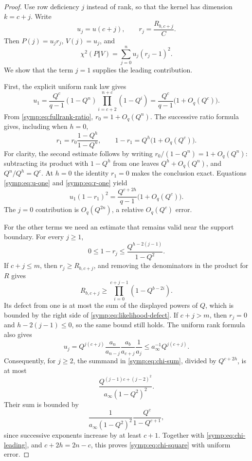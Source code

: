 \begin{proof}
Use row deficiency $j$ instead of rank, so that the kernel has dimension
$k=c+j$.  Write
\[
 u_j=u(c+j),\qquad r_j=\frac{R_{b,c+j}}C.
\]
Then $P(j)=u_jr_j$, $V(j)=u_j$, and
\begin{equation}
 \chi^2(P\Vert V)=\sum_{j=0}^{n}u_j(r_j-1)^2.
 \label{symp:eq:chi-sum}
\end{equation}
We show that the term $j=1$ supplies the leading contribution.

First, the explicit uniform rank law gives
\begin{equation}
 u_1=\frac{Q^c}{q-1}(1-Q^n)
         \prod_{i=c+2}^{n+c}(1-Q^i)
     =\frac{Q^c}{q-1}\bigl(1+O_q(Q^c)\bigr).
 \label{symp:eq:u-one}
\end{equation}
From \eqref{symp:eq:fullrank-ratio}, $r_0=1+O_q(Q^n)$.  The successive
ratio formula gives, including when $h=0$,
\begin{equation}
 r_1=r_0\frac{1-Q^h}{1-Q^n},\qquad
 1-r_1=Q^h\bigl(1+O_q(Q^c)\bigr).
 \label{symp:eq:r-one}
\end{equation}
For clarity, the second estimate follows by writing
$r_0/(1-Q^n)=1+O_q(Q^n)$: subtracting its product with $1-Q^h$ from one
leaves $Q^h+O_q(Q^n)$, and $Q^n/Q^h=Q^c$.  At $h=0$ the identity
$r_1=0$ makes the conclusion exact.  Equations
\eqref{symp:eq:u-one} and \eqref{symp:eq:r-one} yield
\begin{equation}
 u_1(1-r_1)^2
 =\frac{Q^{c+2h}}{q-1}\bigl(1+O_q(Q^c)\bigr).
 \label{symp:eq:chi-leading}
\end{equation}
The $j=0$ contribution is $O_q(Q^{2n})$, a relative
$O_q(Q^c)$ error.

For the other terms we need an estimate that remains valid near the support
boundary.  For every $j\ge1$,
\begin{equation}
 0\le1-r_j\le\frac{Q^{h-2(j-1)}}{1-Q^2}.
 \label{symp:eq:likelihood-defect}
\end{equation}
If $c+j\le m$, then $r_j\ge R_{b,c+j}$, and removing the denominators in
the product for $R$ gives
\[
 R_{b,c+j}\ge\prod_{i=0}^{c+j-1}(1-Q^{b-2i}).
\]
Its defect from one is at most the sum of the displayed powers of $Q$,
which is bounded by the right side of
\eqref{symp:eq:likelihood-defect}.  If $c+j>m$, then $r_j=0$ and
$h-2(j-1)\le0$, so the same bound still holds.  The uniform rank formula
also gives
\begin{equation}
 u_j=Q^{j(c+j)}
       \frac{a_n}{a_{n-j}}\frac{a_b}{a_{c+j}}\frac1{a_j}
     \le a_\infty^{-1}Q^{j(c+j)}.
 \label{symp:eq:rank-tail-bound}
\end{equation}
Consequently, for $j\ge2$, the summand in
\eqref{symp:eq:chi-sum}, divided by $Q^{c+2h}$, is at most
\[
 \frac{Q^{(j-1)c+(j-2)^2}}{a_\infty(1-Q^2)^2}.
\]
Their sum is bounded by
\begin{equation}
 \frac{1}{a_\infty(1-Q^2)^2}
       \frac{Q^c}{1-Q^{c+1}},
 \label{symp:eq:chi-remainder}
\end{equation}
since successive exponents increase by at least $c+1$.  Together with
\eqref{symp:eq:chi-leading}, and $c+2h=2n-c$, this proves
\eqref{symp:eq:chi-square} with uniform error.


\end{proof}

